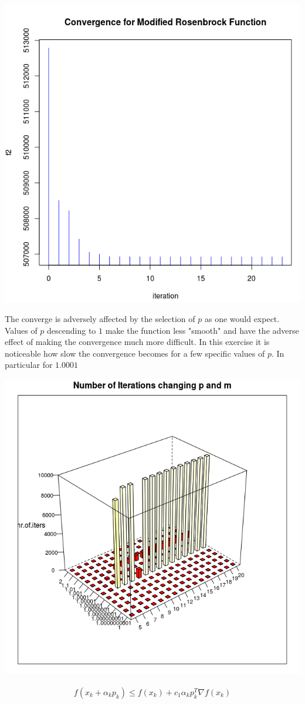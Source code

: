 \begin{center}
\includegraphics[scale=0.3]{Figures/convergence.png}
\end{center}

The converge is adversely affected by the selection of $p$ as one would expect. Values of $p$ descending to $1$ make the function less "smooth" and have the adverse effect of making the convergence much more difficult. In this exercise it is noticeable how slow the convergence becomes for a few specific values of $p$. In particular for $1.0001$

\begin{center}
\includegraphics[scale=0.3]{Figures/hist3dmpniter.png}
\end{center}

\begin{equation}
  \begin{aligned}
    f(x_k + \alpha_kp_k) \leq f(x_k) + c_1 \alpha _k p_k^T\nabla f(x_k)
  \end{aligned}
\end{equation}

